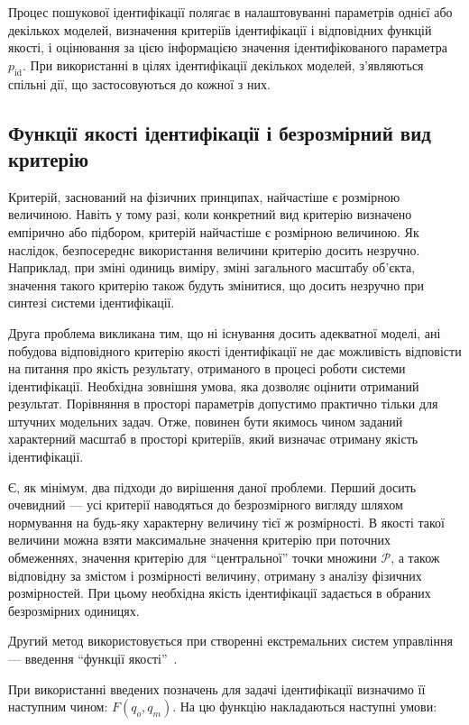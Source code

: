 Процес пошукової ідентифікації полягає в налаштовуванні параметрів однієї або
декількох моделей, визначення критеріїв ідентифікації і відповідних функцій
якості, і оцінювання за цією інформацією значення ідентифікованого параметра
\label{atu:d:p_id}$p_\mathrm{id}$. При використанні в цілях
ідентифікації декількох моделей, з'являються спільні дії, що застосовуються до
кожної з них.




\subsection{Функції якості ідентифікації і безрозмірний вид критерію} %


Критерій, заснований на фізичних принципах, найчастіше є розмірною величиною.
Навіть у тому разі, коли конкретний вид критерію визначено емпірично або
підбором, критерій найчастіше є розмірною величиною.
Як наслідок, безпосереднє
використання величини критерію досить незручно. Наприклад, при зміні одиниць
виміру, зміні загального масштабу об'єкта, значення такого критерію також
будуть змінитися, що досить незручно при синтезі системи ідентифікації.

Друга проблема викликана тим, що ні існування досить
адекватної моделі, ані побудова відповідного критерію якості
ідентифікації не дає можливість відповісти на питання
про якість результату, отриманого в процесі роботи системи
ідентифікації. Необхідна зовнішня умова, яка дозволяє оцінити
отриманий результат. Порівняння в просторі параметрів допустимо
практично тільки для штучних модельних задач. Отже, повинен
бути якимось чином заданий характерний масштаб в просторі
критеріїв, який визначає отриману якість ідентифікації.

Є, як мінімум, два підходи до вирішення даної проблеми. Перший
досить очевидний --- усі критерії наводяться до безрозмірного
вигляду шляхом нормування на будь-яку характерну величину тієї ж
розмірності. В якості такої величини можна взяти максимальне
значення критерію при поточних обмеженнях, значення критерію
для ``центральної'' точки множини $\mathcal{P}$,
а також відповідну за змістом і розмірності величину,
отриману з аналізу фізичних розмірностей. При цьому необхідна
якість ідентифікації задається в обраних безрозмірних одиницях.

Другий метод використовується при створенні екстремальних систем управління ---
введення ``функції якості''~\cite{eykhoff_modern_id,info_cipkin}.

При використанні введених позначень для задачі ідентифікації
визначимо її наступним чином:
\label{atu:d:F}$F(q_o, q_m)$.
На цю функцію накладаються наступні умови:

